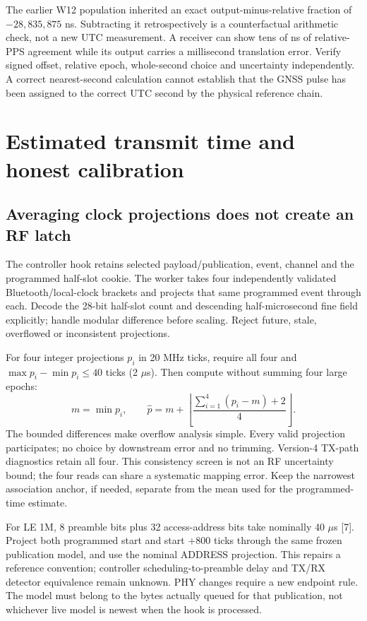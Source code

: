 \documentclass[10pt,letterpaper]{article}
\begin{document}
The earlier W12 population inherited an exact output-minus-relative fraction of $-28{,}835{,}875$ ns. Subtracting it retrospectively is a counterfactual arithmetic check, not a new UTC measurement. A receiver can show tens of ns of relative-PPS agreement while its output carries a millisecond translation error. Verify signed offset, relative epoch, whole-second choice and uncertainty independently. A correct nearest-second calculation cannot establish that the GNSS pulse has been assigned to the correct UTC second by the physical reference chain.
\newpage
\section{Estimated transmit time and honest calibration}
\subsection{Averaging clock projections does not create an RF latch}
The controller hook retains selected payload/publication, event, channel and the programmed half-slot cookie. The worker takes four independently validated Bluetooth/local-clock brackets and projects that same programmed event through each. Decode the 28-bit half-slot count and descending half-microsecond fine field explicitly; handle modular difference before scaling. Reject future, stale, overflowed or inconsistent projections.

For four integer projections $p_i$ in 20 MHz ticks, require all four and $\max p_i-\min p_i\le40$ ticks (2 $\mu$s). Then compute without summing four large epochs:
\[
 m=\min p_i,\qquad \widehat p=m+
 \left\lfloor\frac{\sum_{i=1}^4(p_i-m)+2}{4}\right\rfloor.
\]
The bounded differences make overflow analysis simple. Every valid projection participates; no choice by downstream error and no trimming. Version-4 TX-path diagnostics retain all four. This consistency screen is not an RF uncertainty bound; the four reads can share a systematic mapping error. Keep the narrowest association anchor, if needed, separate from the mean used for the programmed-time estimate.

For LE 1M, 8 preamble bits plus 32 access-address bits take nominally 40 $\mu$s [7]. Project both programmed start and start $+800$ ticks through the same frozen publication model, and use the nominal ADDRESS projection. This repairs a reference convention; controller scheduling-to-preamble delay and TX/RX detector equivalence remain unknown. PHY changes require a new endpoint rule. The model must belong to the bytes actually queued for that publication, not whichever live model is newest when the hook is processed.
\end{document}
